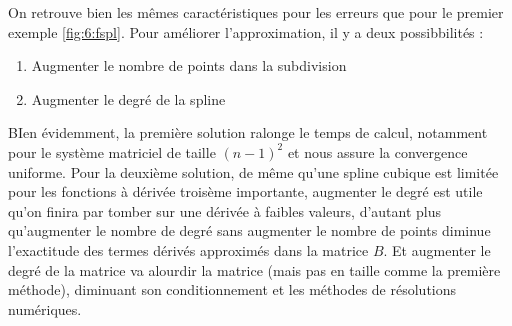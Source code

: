 On retrouve bien les mêmes caractéristiques pour les erreurs que pour le premier exemple \ref{fig:6:fspl}. Pour améliorer l'approximation,
il y a deux possibbilités :
\begin{enumerate}
\item Augmenter le nombre de points dans la subdivision
\item Augmenter le degré de la spline
\end{enumerate}
BIen évidemment, la première solution ralonge le temps de calcul, notamment pour le système matriciel de taille $(n-1)^2$ et nous assure la convergence
uniforme. Pour la deuxième solution, de même qu'une spline cubique est limitée pour les fonctions à dérivée troisème importante, augmenter le degré
est utile qu'on finira par tomber sur une dérivée à faibles valeurs, d'autant plus qu'augmenter le nombre de degré sans augmenter le nombre de points
diminue l'exactitude des termes dérivés approximés dans la matrice $B$. Et augmenter le degré de la matrice va alourdir la matrice (mais pas en taille
comme la première méthode), diminuant son conditionnement et les méthodes de résolutions numériques.